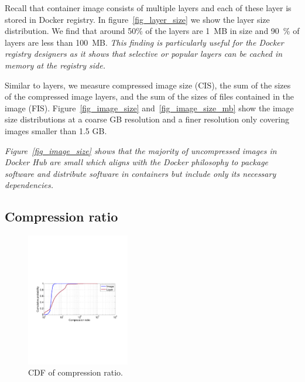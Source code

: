Recall that container image consists of multiple layers and each of these layer
is stored in Docker registry.  In figure~\ref{fig_layer_size} we show the layer
size distribution. We find that around 50\% of the layers are 1~MB in size and
90~\% of layers are less than 100~MB. \emph{This finding is particularly useful for
the Docker registry designers as it shows that selective or popular layers can
be cached in memory at the registry side.}

Similar to layers, we measure compressed image size (CIS), \ie the sum of the
sizes of the compressed image layers, and the sum of the sizes of files
contained in the image (FIS). Figure~\ref{fig_image_size}
and~\ref{fig_image_size_mb} show the image size distributions at a coarse GB
resolution and a finer resolution only covering images smaller than 1.5 GB.

\emph{Figure~\ref{fig_image_size} shows that the majority of uncompressed images in
Docker Hub are small which aligns with the Docker philosophy to package
software and distribute software in containers but include only its necessary
dependencies.}

\subsection{Compression ratio}
\begin{figure}
	\centering
	\includegraphics[width=0.4\textwidth]{graphs/compress-ratio-cdf.pdf}
	\caption{CDF of compression ratio.
	}
	\label{fig:compress-ratio}
\end{figure}

